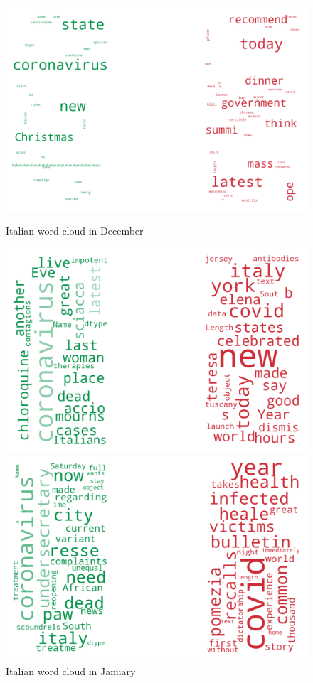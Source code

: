 \begin{landscape}
\newpage

\begin{figure}[!htb]
  \includegraphics[width=\linewidth]{December it word cloud.png}
  \caption{Italian word cloud in December}\label{fig:decemberit}
\endminipage\hfill
{}
  \includegraphics[width=\linewidth]{January it word cloud.png}
  \caption{Italian word cloud in January}\label{fig:januaryit}
\endminipage\hfill
{}
  \includegraphics[width=\linewidth]{February it word cloud.png}

\end{figure}
\end{landscape}
